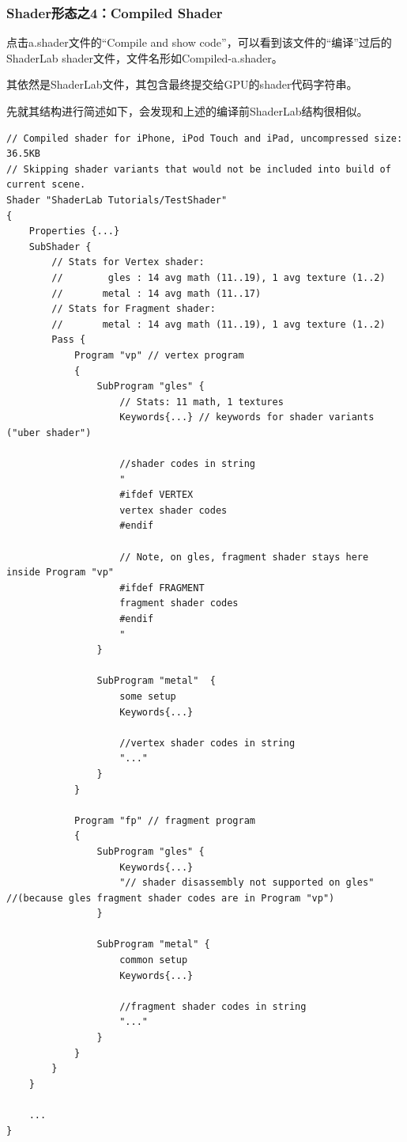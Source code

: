 \documentclass[9pt, b5paper]{article}
\begin{document}
\subsubsection{Shader形态之4：Compiled Shader}
\label{sec:orgad8c506}

点击a.shader文件的“Compile and show code”，可以看到该文件的“编译”过后的ShaderLab shader文件，文件名形如Compiled-a.shader。

其依然是ShaderLab文件，其包含最终提交给GPU的shader代码字符串。

先就其结构进行简述如下，会发现和上述的编译前ShaderLab结构很相似。

\begin{verbatim}
// Compiled shader for iPhone, iPod Touch and iPad, uncompressed size: 36.5KB
// Skipping shader variants that would not be included into build of current scene.
Shader "ShaderLab Tutorials/TestShader"
{
    Properties {...}
    SubShader {
        // Stats for Vertex shader:
        //        gles : 14 avg math (11..19), 1 avg texture (1..2)
        //       metal : 14 avg math (11..17)
        // Stats for Fragment shader:
        //       metal : 14 avg math (11..19), 1 avg texture (1..2)
        Pass {
            Program "vp" // vertex program
            {
                SubProgram "gles" {
                    // Stats: 11 math, 1 textures
                    Keywords{...} // keywords for shader variants ("uber shader")

                    //shader codes in string
                    "
                    #ifdef VERTEX
                    vertex shader codes
                    #endif

                    // Note, on gles, fragment shader stays here inside Program "vp"
                    #ifdef FRAGMENT
                    fragment shader codes
                    #endif
                    " 
                }

                SubProgram "metal"  {
                    some setup
                    Keywords{...}

                    //vertex shader codes in string
                    "..."
                }
            }

            Program "fp" // fragment program
            {
                SubProgram "gles" {
                    Keywords{...}
                    "// shader disassembly not supported on gles" //(because gles fragment shader codes are in Program "vp") 
                }

                SubProgram "metal" {
                    common setup
                    Keywords{...}

                    //fragment shader codes in string
                    "..."
                }
            }
        }
    }

    ...
}
\end{verbatim}
\end{document}
